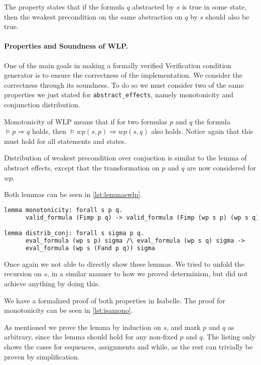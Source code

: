 The property states that if the formula $q$ abstracted by $s$ is true in some state,
 then the weakest precondition on the same abstraction on $q$ by $s$ should also be true.

\paragraph{Properties and Soundness of WLP.}
One of the main goals in making a formally verified Verification condition generator is to ensure the correctness of the implementation.
We consider the correctness through its soundness.
To do so we must consider two of the same properties we just stated for \texttt{abstract\_effects}, namely monotonicity and conjunction distribution.

Monotonicity of WLP means that if for two formulas $p$ and $q$ the formula $\vDash p \Rightarrow q$ holds, then $\vDash wp(s, p) \Rightarrow wp(s,q)$ also holds.
Notice again that this must hold for all statements and states.

Distribution of weakest precondition over conjuction is similar to the lemma of abstract effects, except that the transformation on $p$ and $q$ are now considered for $wp$.

Both lemmas can be seen in \autoref{lst:lemmaswlp}.

\begin{lstlisting}[caption={Lemmas for stating monotonicity and distribution over conjunction for wlp},label={lst:lemmaswlp},language=sml]
lemma monotonicity: forall s p q.
      valid_formula (Fimp p q) -> valid_formula (Fimp (wp s p) (wp s q))

lemma distrib_conj: forall s sigma p q.
      eval_formula (wp s p) sigma /\ eval_formula (wp s q) sigma ->
      eval_formula (wp s (Fand p q)) sigma
\end{lstlisting}

Once again we not able to directly show these lemmas.
We tried to unfold the recursion on $s$, in a similar manner to how we proved determinism, but
 did not achieve anything by doing this.

We have a formalized proof of both properties in Isabelle.
The proof for monotonicity can be seen in \autoref{lst:isamono}.

As mentioned we prove the lemma by induction on $s$,
and mark $p$ and $q$ as arbitrary, since the lemma should hold for any non-fixed $p$ and $q$.
The listing only shows the cases for sequences, assignments and while, as the rest can trivially be proven by simplification.

